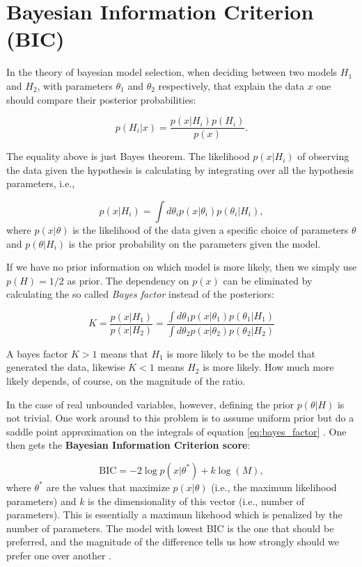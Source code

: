 \section{Bayesian Information Criterion (BIC)}

In the theory of bayesian model selection, when deciding between two models $H_1$ and $H_2$, with parameters $\theta_1$ and $\theta_2$
respectively, that explain the data $x$ one should compare their
posterior probabilities:

\begin{equation}
  \label{eq:5}
  p(H_i | x) = \frac{p(x | H_i) p(H_i)}{p(x)}.
\end{equation}

The equality above is just Bayes theorem. The likelihood $p(x | H_i)$ of observing the data given the hypothesis is
calculating by integrating over all the hypothesis parameters, i.e.,

\begin{equation}
  \label{eq:7}
  p(x | H_i) = \int d\theta_i p(x | \theta_i) p(\theta_i | H_i),
\end{equation}
where $p(x | \theta)$ is the likelihood of the data given a specific choice of parameters $\theta$ and $p(\theta | H_i)$ is the prior
probability on the parameters given the model.

If we have no prior information on which model is more likely, then we simply
use $p(H) = 1/2$ as prior. The dependency on $p(x)$ can be eliminated by calculating the so called \emph{Bayes factor} instead of the posteriors:

\begin{equation}
  \label{eq:bayes_factor}
  K = \frac{p(x | H_1)}{p(x | H_2)} = \frac{\int d\theta_1 p(x | \theta_1) p(\theta_1 | H_1)}{\int d\theta_2 p(x | \theta_2) p(\theta_2 | H_2)}
\end{equation}

A bayes factor $K>1$ means that $H_1$ is more likely to be the model
that generated the data, likewise $K<1$ means $H_2$ is more
likely. How much more likely depends, of course, on the magnitude of
the ratio.

In the case of real unbounded variables, however, defining the prior
$p(\theta | H)$ is not trivial. One work around to this problem is to
assume uniform prior but do a saddle point approximation on the integrals
of equation \ref{eq:bayes_factor} \cite{BishopBook}. One then gets the \textbf{Bayesian Information Criterion score}:

\begin{equation}
  \label{eq:BIC}
  \text{BIC} = -2\log p(x | \theta^{*}) + k \log(M),
\end{equation}
where $\theta^*$ are the values that maximize $p(x|\theta)$ (i.e., the
maximum likelihood parameters) and $k$ is the dimensionality of this
vector (i.e., number of parameters). This is essentially a maximum
likehood which is penalized by the number of parameters. The model
with lowest BIC is the one that should be preferred, and the magnitude
of the difference tells us how strongly should we prefer one over
another \cite{Kass95}.
